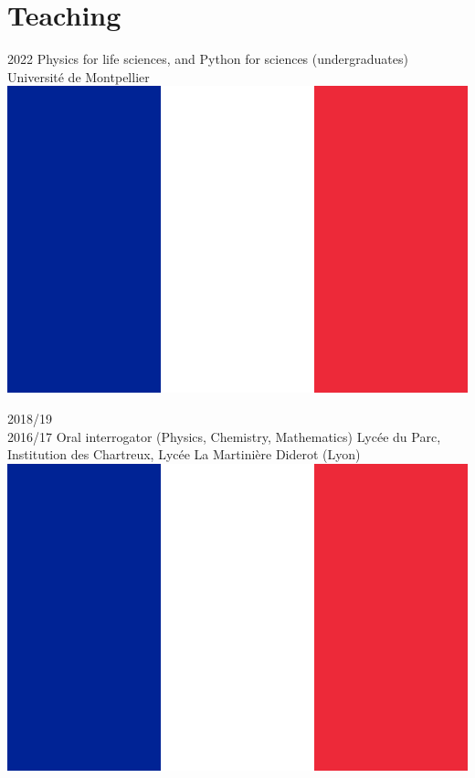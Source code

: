 \documentclass[letterpaper]{cvtemplate_en} %
\begin{document}

\section{Teaching}

\begin{cvbody}

\cvitem
	{2022}
	{}
	{Physics for life sciences, and Python for sciences (undergraduates)}
	{Université de Montpellier \includegraphics[height=0.8\myheight]{fr}}
	{}{}{}
	{}
	{}

\cvitem
	{2018/19\\ \mbox{}\hfill 2016/17}
	{}
	{Oral interrogator (Physics, Chemistry, Mathematics)}
	{Lyc\'ee du Parc, Institution des Chartreux, Lyc\'ee La Martinière Diderot (Lyon) \includegraphics[height=0.8\myheight]{fr}}
	{}{}{}
	{}
	{
	}


\end{cvbody}
\end{document}
